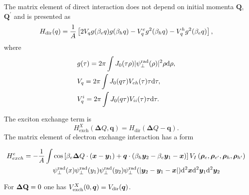 \documentclass[prb,twocolumn,preprintnumbers,superscriptaddress]{revtex4}
\begin{document}
%
The matrix element of direct interaction does not depend on initial momenta ${\bm Q}$, ${\bm Q}^\prime$ and is presented as
%
\begin{align}
    H_{ {\rm dir}}(q)  =  \frac{1}{A} \left[  2 V_q g(\beta_e q) g(\beta_h q) 
    - V^{e}_q g^2(\beta_h q)  
    - V^{h}_q g^2(\beta_e q)  \right],
\end{align}
%
where
%
\begin{align}
&g(\tau) =  2\pi \int J_0(\tau \rho)  |\psi_\perp^{\rm rad}(\rho)|^2 \rho {\rm d} \rho , \notag \\
&V_q = 2\pi \int J_0(q \tau)   V_{eh}(\tau)  \tau {\rm d} \tau , \notag\\
&V^{i}_q = 2\pi \int J_0(q \tau)   V_{ii}(\tau)  \tau {\rm d} \tau. 
\end{align}
%
%


The exciton exchange term is
%
\begin{equation}
H^X_{\mathrm{exch}}({\bm \Delta Q}, {\bm q}) =  H_{\mathrm{dir}}({\bm \Delta Q} - {\bm q}).
\end{equation}
%
The matrix element of electron exchange interaction has a form
%
\begin{widetext}
%
\begin{align}
    H_{exch}^e =  - \frac{1}{A}\int & \cos \left[ \beta_e {\bm \Delta Q} \cdot( {\bm x} -{\bm y}_1) + {\bm q}\cdot ( \beta_h {\bm y}_2 - \beta_e {\bm y}_1 -{\bm x}  ) \right]      V_I \left( {\bm \rho}_e, {\bm \rho} _{e^\prime}, {\bm \rho}_h, {\bm \rho}_{h^\prime} \right) \notag \\
    & \psi_\perp^{\rm rad}(x)
    \psi_\perp^{\rm rad}(y_1) \psi_\perp^{\rm rad}(y_2) \psi_\perp^{\rm rad}(|{\bm y}_2 -{\bm y}_1 -{\bm x}|)
    {\rm d}^2 {\bm x} {\rm d}^2 {\bm y}_1 {\rm d}^2 {\bm y}_2 
\end{align}
%
\end{widetext}
%
For ${\bf \Delta Q}=0$ one has
$V^X_{{\rm exch}} (0, {\bm q}) = V_{{\rm dir}} ( {\bm q})$. 
\end{document}
